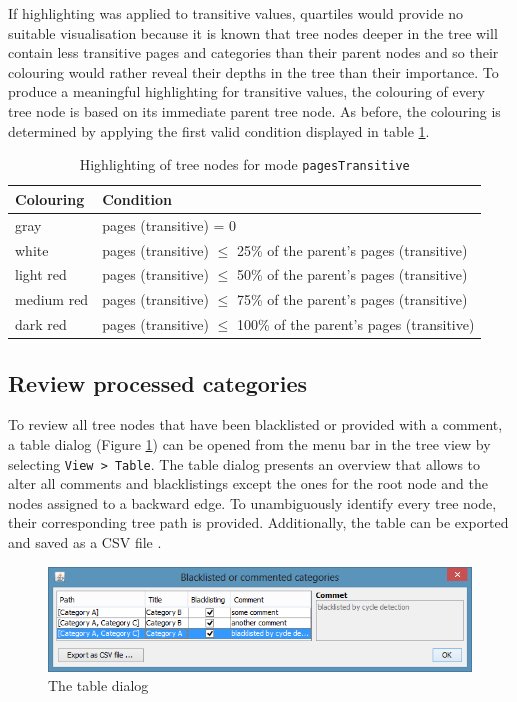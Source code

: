 \documentclass{scrartcl}
\begin{document}
If highlighting was applied to transitive values, quartiles would provide no suitable visualisation because it is known that tree nodes deeper in the tree will contain less transitive pages and categories than their parent nodes and so their colouring would rather reveal their depths in the tree than their importance. To produce a meaningful highlighting for transitive values, the colouring of every tree node is based on its immediate parent tree node. As before, the colouring is determined by applying the first valid condition displayed in table \ref{tab:highlighting_pages_transitive}.

\begin{table}[ht]
\scriptsize
\centering
\begin{tabular}{ll}
\toprule 
\textbf{Colouring} & \textbf{Condition} \\
\midrule
gray & pages (transitive) = 0 \\ 
\midrule
white & pages (transitive) $\le$ 25\% of the parent's pages (transitive)\\ 
\midrule
light red & pages (transitive) $\le$ 50\% of the parent's pages (transitive)\\ 
\midrule
medium red & pages (transitive) $\le$ 75\% of the parent's pages (transitive)\\ 
\midrule
dark red & pages (transitive) $\le$ 100\% of the parent's pages (transitive)\\
\bottomrule
\end{tabular} 
\caption{Highlighting of tree nodes for mode \texttt{pagesTransitive}}
\label{tab:highlighting_pages_transitive}
\end{table}

\subsection{Review processed categories}
\label{sec:review}

To review all tree nodes that have been blacklisted or provided with a comment, a table dialog (Figure \ref{fig:table_dialog}) can be opened from the menu bar in the tree view by selecting \texttt{View > Table}. The table dialog presents an overview that allows to alter all comments and blacklistings except the ones for the root node and the nodes assigned to a backward edge. To unambiguously identify every tree node, their corresponding tree path is provided. Additionally, the table can be exported and saved as a CSV file \cite{RFC4180}.

\begin{figure}[ht]
\centering
\includegraphics[scale=0.8]{figures/table_dialog.png}
\caption{The table dialog}
\label{fig:table_dialog}
\end{figure}
\end{document}
